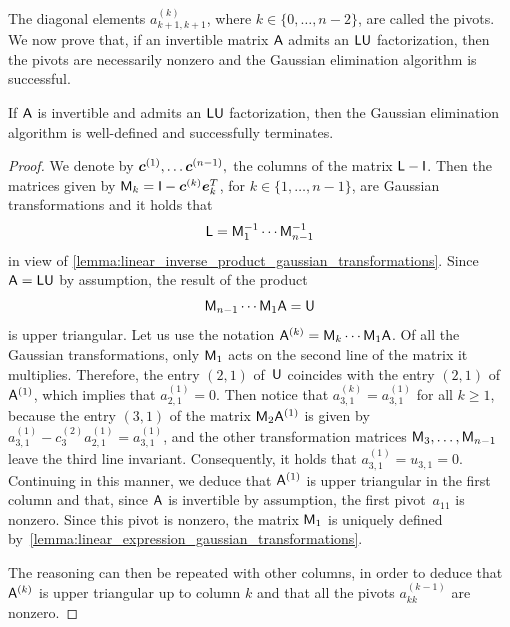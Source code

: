 The diagonal elements $a^{(k)}_{k+1,k+1}$, where $k \in \{0, \dots, n-2 \}$, are called the pivots.
We now prove that,
if an invertible matrix $\mathsf A$ admits an $\mathsf L \mathsf U$ factorization,
then the pivots are necessarily nonzero and the Gaussian elimination algorithm is successful.
\begin{proposition}
    \label{proposition:linear_uniqueness_lu}
    If $\mathsf A$ is invertible and admits an $\mathsf L \mathsf U$  factorization,
    then the Gaussian elimination algorithm is well-defined and successfully terminates.
\end{proposition}
\begin{proof}
    We denote by $\mathbf{\boldsymbol{c}}^{(1)}, \dots \mathbf{\boldsymbol{c}}^{(n-1)},$ the columns of the matrix $\mathsf L - \mathsf I$.
    Then the matrices given by $\mathsf M_k = \mathsf I - \mathbf{\boldsymbol{c}}^{(k)} \mathbf{\boldsymbol{e}}_{k}^T$,
    for $k \in \{1, \dotsc, n-1 \}$,
    are Gaussian transformations and it holds that
    \[
        \mathsf L = \mathsf M_1^{-1} \dotsb  \mathsf M_{n-1}^{-1}
    \]
    in view of \cref{lemma:linear_inverse_product_gaussian_transformations}.
    Since $\mathsf A = \mathsf L \mathsf U$ by assumption,
    the result of the product
    \[
        \mathsf M_{n-1} \dotsb \mathsf M_1 \mathsf A = \mathsf U
    \]
    is upper triangular.
    Let us use the notation $\mathsf A^{(k)} = \mathsf M_{k} \dotsb \mathsf M_1 \mathsf A$.
    Of all the Gaussian transformations,
    only $\mathsf M_1$ acts on the second line of the matrix it multiplies.
    Therefore, the entry $(2, 1)$ of~$\mathsf U$ coincides with the entry $(2, 1)$ of $\mathsf A^{(1)}$,
    which implies that $a^{(1)}_{2,1} = 0$.
    Then notice that $a^{(k)}_{3,1} = a^{(1)}_{3, 1}$ for all $k \geq 1$,
    because the entry $(3, 1)$ of the matrix $\mathsf M_2 \mathsf A^{(1)}$ is given by $a^{(1)}_{3,1} - c^{(2)}_3 a^{(1)}_{2,1} = a^{(1)}_{3,1}$,
    and the other transformation matrices $\mathsf M_3, \dotsc, \mathsf M_{n-1}$ leave the third line invariant.
    Consequently, it holds that $a^{(1)}_{3,1} = u_{3,1} = 0$.
    Continuing in this manner,
    we deduce that $\mathsf A^{(1)}$ is upper triangular in the first column and that,
    since $\mathsf A$ is invertible by assumption,
    the first pivot~$a_{11}$ is nonzero.
    Since this pivot is nonzero,
    the matrix $\mathsf M_1$ is uniquely defined by~\cref{lemma:linear_expression_gaussian_transformations}.

    The reasoning can then be repeated with other columns,
    in order to deduce that $\mathsf A^{(k)}$ is upper triangular up to column $k$ and that all the pivots $a^{(k-1)}_{kk}$ are nonzero.
\end{proof}


